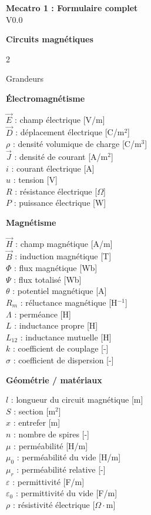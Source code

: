 \documentclass[10pt,a4paper]{article}
\newcommand{\metboxback}{white}
\newcommand{\metboxframe}{black}
\begin{document}
\begin{center}
{\Large \textbf{Mecatro 1 : Formulaire complet}}\\
{V0.0}
\end{center}

\begin{center}
{\Large \textbf{Circuits magnétiques}}
\end{center}

\renewcommand{\metboxback}{blue!4}
\renewcommand{\metboxframe}{blue!65!black}

\begin{multicols}{2}

\begin{metbox}{Grandeurs}

\textbf{Électromagnétisme}

$\vec E$ : champ électrique [V/m] \\
$\vec D$ : déplacement électrique [C/m$^2$] \\
$\rho$ : densité volumique de charge [C/m$^3$] \\
$\vec J$ : densité de courant [A/m$^2$] \\
$i$ : courant électrique [A] \\
$u$ : tension [V] \\
$R$ : résistance électrique [$\Omega$] \\
$P$ : puissance électrique [W]

\medskip
\textbf{Magnétisme}

$\vec H$ : champ magnétique [A/m] \\
$\vec B$ : induction magnétique [T] \\
$\Phi$ : flux magnétique [Wb] \\
$\Psi$ : flux totalisé [Wb] \\
$\theta$ : potentiel magnétique [A] \\
$R_m$ : réluctance magnétique [H$^{-1}$] \\
$\Lambda$ : perméance [H] \\
$L$ : inductance propre [H] \\
$L_{12}$ : inductance mutuelle [H] \\
$k$ : coefficient de couplage [-] \\
$\sigma$ : coefficient de dispersion [-]

\medskip
\textbf{Géométrie / matériaux}

$l$ : longueur du circuit magnétique [m] \\
$S$ : section [m$^2$] \\
$x$ : entrefer [m] \\
$n$ : nombre de spires [-] \\
$\mu$ : perméabilité [H/m] \\
$\mu_0$ : perméabilité du vide [H/m] \\
$\mu_r$ : perméabilité relative [-] \\
$\varepsilon$ : permittivité [F/m] \\
$\varepsilon_0$ : permittivité du vide [F/m] \\
$\rho$ : résistivité électrique [$\Omega\cdot$m]


\end{metbox}
\end{multicols}
\end{document}
